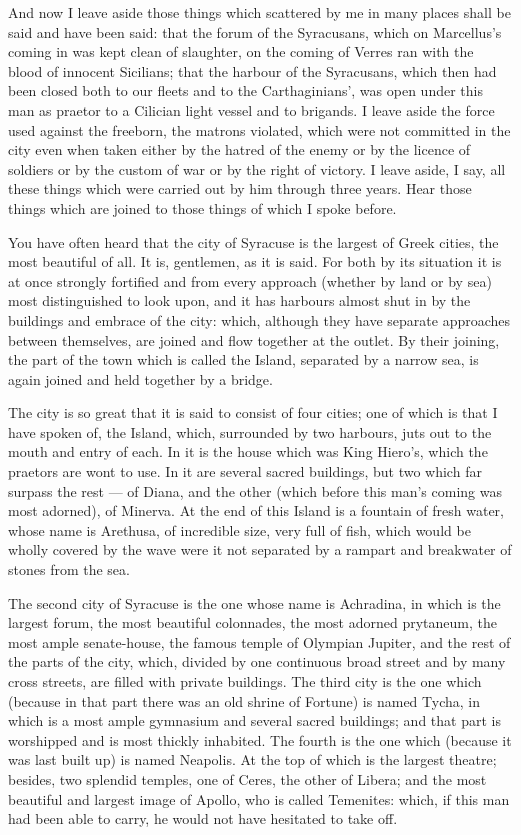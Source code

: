  And now I leave aside those things which scattered by me in many places shall be said and have been said: that the forum of the Syracusans, which on Marcellus's coming in was kept clean of slaughter, on the coming of Verres ran with the blood of innocent Sicilians; that the harbour of the Syracusans, which then had been closed both to our fleets and to the Carthaginians', was open under this man as praetor to a Cilician light vessel and to brigands. I leave aside the force used against the freeborn, the matrons violated, which were not committed in the city even when taken either by the hatred of the enemy or by the licence of soldiers or by the custom of war or by the right of victory. I leave aside, I say, all these things which were carried out by him through three years. Hear those things which are joined to those things of which I spoke before.

 You have often heard that the city of Syracuse is the largest of Greek cities, the most beautiful of all. It is, gentlemen, as it is said. For both by its situation it is at once strongly fortified and from every approach (whether by land or by sea) most distinguished to look upon, and it has harbours almost shut in by the buildings and embrace of the city: which, although they have separate approaches between themselves, are joined and flow together at the outlet. By their joining, the part of the town which is called the Island, separated by a narrow sea, is again joined and held together by a bridge.

 The city is so great that it is said to consist of four cities; one of which is that I have spoken of, the Island, which, surrounded by two harbours, juts out to the mouth and entry of each. In it is the house which was King Hiero's, which the praetors are wont to use. In it are several sacred buildings, but two which far surpass the rest --- of Diana, and the other (which before this man's coming was most adorned), of Minerva. At the end of this Island is a fountain of fresh water, whose name is Arethusa, of incredible size, very full of fish, which would be wholly covered by the wave were it not separated by a rampart and breakwater of stones from the sea.

 The second city of Syracuse is the one whose name is Achradina, in which is the largest forum, the most beautiful colonnades, the most adorned prytaneum, the most ample senate-house, the famous temple of Olympian Jupiter, and the rest of the parts of the city, which, divided by one continuous broad street and by many cross streets, are filled with private buildings. The third city is the one which (because in that part there was an old shrine of Fortune) is named Tycha, in which is a most ample gymnasium and several sacred buildings; and that part is worshipped and is most thickly inhabited. The fourth is the one which (because it was last built up) is named Neapolis. At the top of which is the largest theatre; besides, two splendid temples, one of Ceres, the other of Libera; and the most beautiful and largest image of Apollo, who is called Temenites: which, if this man had been able to carry, he would not have hesitated to take off.

